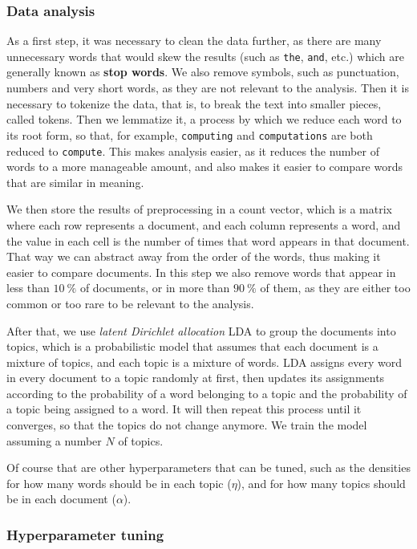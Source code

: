\documentclass[conference, onecolumn]{IEEEtran}
\begin{document}
\subsubsection{Data analysis} \label{sec:methodology:statistics-analysis}

As a first step, it was necessary to clean the data further, as there are many
unnecessary words that would skew the results (such as \verb|the|, \verb|and|,
etc.) which are generally known as \textbf{stop words}.
We also remove symbols, such as punctuation, numbers and very short words, as
they are not relevant to the analysis.
Then it is necessary to tokenize the data, that is, to break the text into
smaller pieces, called tokens.
Then we lemmatize it, a process by which we reduce each word to its root form,
so that, for example, \verb|computing| and \verb|computations| are both reduced
to \verb|compute|.
This makes analysis easier, as it reduces the number of words to a more
manageable amount, and also makes it easier to compare words that are similar
in meaning.

We then store the results of preprocessing in a count vector, which is a matrix
where each row represents a document, and each column represents a word, and
the value in each cell is the number of times that word appears in that
document.
That way we can abstract away from the order of the words, thus making it
easier to compare documents.
In this step we also remove words that appear in less than $\qty{10}{\percent}$
of documents, or in more than $\qty{90}{\percent}$ of them, as they are either
too common or too rare to be relevant to the analysis.

After that, we use \textit{latent Dirichlet allocation} LDA to group the
documents into topics, which is a probabilistic model that assumes that each
document is a mixture of topics, and each topic is a mixture of words.
LDA assigns every word in every document to a topic randomly at first, then
updates its assignments according to the probability of a word belonging to a
topic and the probability of a topic being assigned to a word.
It will then repeat this process until it converges, so that the topics do not
change anymore.
We train the model assuming a number $N$ of topics.

Of course that are other hyperparameters that can be tuned, such as the
densities for how many words should be in each topic ($\eta$), and for how many
topics should be in each document ($\alpha$).

\subsubsection{Hyperparameter tuning} \label{sec:methodology:statistics-hyper}
\end{document}
